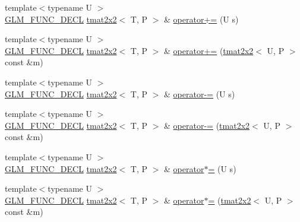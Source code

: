 \begin{DoxyCompactItemize}
\item 
{\footnotesize template$<$typename U $>$ }\\\hyperlink{setup_8hpp_ab2d052de21a70539923e9bcbf6e83a51}{G\+L\+M\+\_\+\+F\+U\+N\+C\+\_\+\+D\+E\+CL} \hyperlink{structglm_1_1detail_1_1tmat2x2}{tmat2x2}$<$ T, P $>$ \& \hyperlink{structglm_1_1detail_1_1tmat2x2_a30f0b88a14ca516adc8717a0032c04d3}{operator+=} (U s)
\item 
{\footnotesize template$<$typename U $>$ }\\\hyperlink{setup_8hpp_ab2d052de21a70539923e9bcbf6e83a51}{G\+L\+M\+\_\+\+F\+U\+N\+C\+\_\+\+D\+E\+CL} \hyperlink{structglm_1_1detail_1_1tmat2x2}{tmat2x2}$<$ T, P $>$ \& \hyperlink{structglm_1_1detail_1_1tmat2x2_a05fd709487eecd8e294390304ff43fec}{operator+=} (\hyperlink{structglm_1_1detail_1_1tmat2x2}{tmat2x2}$<$ U, P $>$ const \&m)
\item 
{\footnotesize template$<$typename U $>$ }\\\hyperlink{setup_8hpp_ab2d052de21a70539923e9bcbf6e83a51}{G\+L\+M\+\_\+\+F\+U\+N\+C\+\_\+\+D\+E\+CL} \hyperlink{structglm_1_1detail_1_1tmat2x2}{tmat2x2}$<$ T, P $>$ \& \hyperlink{structglm_1_1detail_1_1tmat2x2_ac7e38a65f69912901f8d82e65ddd04cc}{operator-\/=} (U s)
\item 
{\footnotesize template$<$typename U $>$ }\\\hyperlink{setup_8hpp_ab2d052de21a70539923e9bcbf6e83a51}{G\+L\+M\+\_\+\+F\+U\+N\+C\+\_\+\+D\+E\+CL} \hyperlink{structglm_1_1detail_1_1tmat2x2}{tmat2x2}$<$ T, P $>$ \& \hyperlink{structglm_1_1detail_1_1tmat2x2_a37b618643e85ebee82bd95369760ec76}{operator-\/=} (\hyperlink{structglm_1_1detail_1_1tmat2x2}{tmat2x2}$<$ U, P $>$ const \&m)
\item 
{\footnotesize template$<$typename U $>$ }\\\hyperlink{setup_8hpp_ab2d052de21a70539923e9bcbf6e83a51}{G\+L\+M\+\_\+\+F\+U\+N\+C\+\_\+\+D\+E\+CL} \hyperlink{structglm_1_1detail_1_1tmat2x2}{tmat2x2}$<$ T, P $>$ \& \hyperlink{structglm_1_1detail_1_1tmat2x2_a981d962c4d65dc12703e2b6e723ec981}{operator$\ast$=} (U s)
\item 
{\footnotesize template$<$typename U $>$ }\\\hyperlink{setup_8hpp_ab2d052de21a70539923e9bcbf6e83a51}{G\+L\+M\+\_\+\+F\+U\+N\+C\+\_\+\+D\+E\+CL} \hyperlink{structglm_1_1detail_1_1tmat2x2}{tmat2x2}$<$ T, P $>$ \& \hyperlink{structglm_1_1detail_1_1tmat2x2_ab56306a2ba75e6dbdd7eed704d6a90df}{operator$\ast$=} (\hyperlink{structglm_1_1detail_1_1tmat2x2}{tmat2x2}$<$ U, P $>$ const \&m)
\item 

\end{DoxyCompactItemize}
